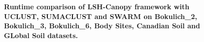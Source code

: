\documentclass[10pt, conference, compsocconf]{IEEEtran}
\begin{document}
\begin{figure}[t]
{		\label{fig:body_sites}}%
	\\
	\hfil
	\\
	\caption{\textbf{Runtime comparison of LSH-Canopy framework with UCLUST, SUMACLUST and SWARM on Bokulich\_2, Bokulich\_3, Bokulich\_6, Body Sites, Canadian Soil and GLobal Soil datasets.}}
	\label{figaccuracyL1}
\end{figure}
\end{document}
